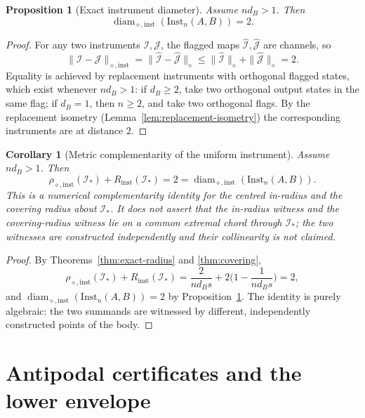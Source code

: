 \documentclass[11pt,a4paper]{article}
\newtheorem{proposition}[theorem]{Proposition}
\newtheorem{corollary}[theorem]{Corollary}
\newcommand{\Inst}{\mathrm{Inst}}
\newcommand{\diam}{\operatorname{diam}}
\begin{document}
\begin{proposition}[Exact instrument diameter]
\label{prop:diameter}
Assume $nd_B>1$. Then
\[
\diam_{\diamond,\mathrm{inst}}(\Inst_n(A,B))=2.
\]
\end{proposition}

\begin{proof}
For any two instruments $\mathcal I,\mathcal J$, the flagged maps $\widehat{\mathcal I},\widehat{\mathcal J}$ are channels, so
\[
\|\mathcal I-\mathcal J\|_{\diamond,\mathrm{inst}}
=\|\widehat{\mathcal I}-\widehat{\mathcal J}\|_\diamond
\le\|\widehat{\mathcal I}\|_\diamond+\|\widehat{\mathcal J}\|_\diamond=2.
\]
Equality is achieved by replacement instruments with orthogonal flagged states, which exist whenever $nd_B>1$: if $d_B\ge2$, take two orthogonal output states in the same flag; if $d_B=1$, then $n\ge2$, and take two orthogonal flags. By the replacement isometry (Lemma~\ref{lem:replacement-isometry}) the corresponding instruments are at distance $2$.
\end{proof}

\begin{corollary}[Metric complementarity of the uniform instrument]
\label{cor:complementarity}
Assume $nd_B>1$. Then
\[
\rho_{\diamond,\mathrm{inst}}(\mathcal I_*)+R_{\mathrm{inst}}(\mathcal I_*)
=2=\diam_{\diamond,\mathrm{inst}}(\Inst_n(A,B)).
\]
This is a numerical complementarity identity for the centred in-radius and the covering radius about $\mathcal I_*$. It does \emph{not} assert that the in-radius witness and the covering-radius witness lie on a common extremal chord through $\mathcal I_*$; the two witnesses are constructed independently and their collinearity is not claimed.
\end{corollary}

\begin{proof}
By Theorems~\ref{thm:exact-radius} and \ref{thm:covering},
\[
\rho_{\diamond,\mathrm{inst}}(\mathcal I_*)+R_{\mathrm{inst}}(\mathcal I_*)
=\frac{2}{nd_Bs}+2\Big(1-\frac1{nd_Bs}\Big)=2,
\]
and $\diam_{\diamond,\mathrm{inst}}(\Inst_n(A,B))=2$ by Proposition~\ref{prop:diameter}. The identity is purely algebraic: the two summands are witnessed by different, independently constructed points of the body.
\end{proof}

\section{Antipodal certificates and the lower envelope}
\label{sec:lower}
\end{document}
